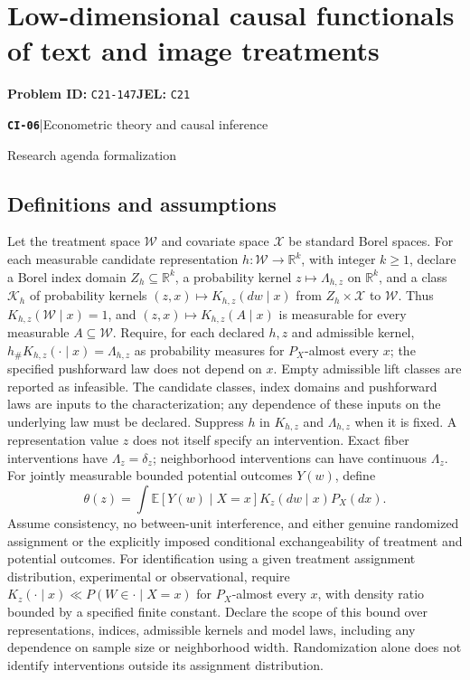 \documentclass[11pt,a4paper]{article}
\newcommand{\R}{\mathbb R}
\newcommand{\E}{\mathbb E}
\newcommand{\entrymeta}[3]{{\sffamily\small\color{muted}\textbf{\texttt{#1}}\quad|\quad #2\par #3\par}}
\begin{document}
\section*{Low-dimensional causal functionals of text and image treatments}
\textbf{Problem ID:} \texttt{C21-147}\quad \textbf{JEL:} \texttt{C21}\par
\label{problem:OP-0485}
\label{beyond:CI-06}
\entrymeta{CI-06}{Econometric theory and causal inference}{Research agenda formalization}
\subsection*{Definitions and assumptions}
Let the treatment space $\mathcal W$ and covariate space $\mathcal X$ be standard Borel spaces. For each measurable candidate representation $h:\mathcal W\to\R^k$, with integer $k\geq1$, declare a Borel index domain $Z_h\subseteq\R^k$, a probability kernel $z\mapsto\Lambda_{h,z}$ on $\R^k$, and a class $\mathcal K_h$ of probability kernels $(z,x)\mapsto K_{h,z}(dw\mid x)$ from $Z_h\times\mathcal X$ to $\mathcal W$. Thus $K_{h,z}(\mathcal W\mid x)=1$, and $(z,x)\mapsto K_{h,z}(A\mid x)$ is measurable for every measurable $A\subseteq\mathcal W$. Require, for each declared $h,z$ and admissible kernel, $h_\#K_{h,z}(\cdot\mid x)=\Lambda_{h,z}$ as probability measures for $P_X$-almost every $x$; the specified pushforward law does not depend on $x$. Empty admissible lift classes are reported as infeasible. The candidate classes, index domains and pushforward laws are inputs to the characterization; any dependence of these inputs on the underlying law must be declared. Suppress $h$ in $K_{h,z}$ and $\Lambda_{h,z}$ when it is fixed. A representation value $z$ does not itself specify an intervention. Exact fiber interventions have $\Lambda_z=\delta_z$; neighborhood interventions can have continuous $\Lambda_z$. For jointly measurable bounded potential outcomes $Y(w)$, define
\[
\theta(z)=\int\E[Y(w)\mid X=x]K_z(dw\mid x)P_X(dx).
\]
Assume consistency, no between-unit interference, and either genuine randomized assignment or the explicitly imposed conditional exchangeability of treatment and potential outcomes. For identification using a given treatment assignment distribution, experimental or observational, require $K_z(\cdot\mid x)\ll P(W\in\cdot\mid X=x)$ for $P_X$-almost every $x$, with density ratio bounded by a specified finite constant. Declare the scope of this bound over representations, indices, admissible kernels and model laws, including any dependence on sample size or neighborhood width. Randomization alone does not identify interventions outside its assignment distribution.
\end{document}
